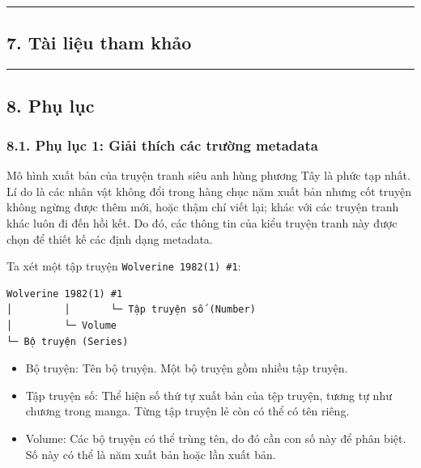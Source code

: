 \documentclass[
]{article}
\begin{document}
\begin{center}\rule{0.5\linewidth}{0.5pt}\end{center}

\hypertarget{tuxe0i-liux1ec7u-tham-khux1ea3o}{%
\subsection{\texorpdfstring{7. Tài liệu tham khảo
}{7. Tài liệu tham khảo }}\label{tuxe0i-liux1ec7u-tham-khux1ea3o}}

\begin{center}\rule{0.5\linewidth}{0.5pt}\end{center}

\hypertarget{phux1ee5-lux1ee5c}{%
\subsection{\texorpdfstring{8. Phụ lục
}{8. Phụ lục }}\label{phux1ee5-lux1ee5c}}

\hypertarget{phux1ee5-lux1ee5c-1-giux1ea3i-thuxedch-cuxe1c-trux1b0ux1eddng-metadata}{%
\subsubsection{\texorpdfstring{8.1. Phụ lục 1: Giải thích các trường
metadata
}{8.1. Phụ lục 1: Giải thích các trường metadata }}\label{phux1ee5-lux1ee5c-1-giux1ea3i-thuxedch-cuxe1c-trux1b0ux1eddng-metadata}}

Mô hình xuất bản của truyện tranh siêu anh hùng phương Tây là phức tạp
nhất. Lí do là các nhân vật không đổi trong hàng chục năm xuất bản nhưng
cốt truyện không ngừng được thêm mới, hoặc thậm chí viết lại; khác với
các truyện tranh khác luôn đi đến hồi kết. Do đó, các thông tin của kiểu
truyện tranh này được chọn để thiết kế các định dạng metadata.

Ta xét một tập truyện \texttt{Wolverine\ 1982(1)\ \#1}:

\begin{verbatim}
Wolverine 1982(1) #1
│         │       └─ Tập truyện số (Number)
│         └─ Volume
└─ Bộ truyện (Series)
\end{verbatim}

\begin{itemize}
\item
  Bộ truyện: Tên bộ truyện. Một bộ truyện gồm nhiều tập truyện.
\item
  Tập truyện số: Thể hiện số thứ tự xuất bản của tệp truyện, tương tự
  như chương trong manga. Từng tập truyện lẻ còn có thể có tên riêng.
\item
  Volume: Các bộ truyện có thể trùng tên, do đó cần con số này để phân
  biệt. Số này có thể là năm xuất bản hoặc lần xuất bản.
\end{itemize}
\end{document}
